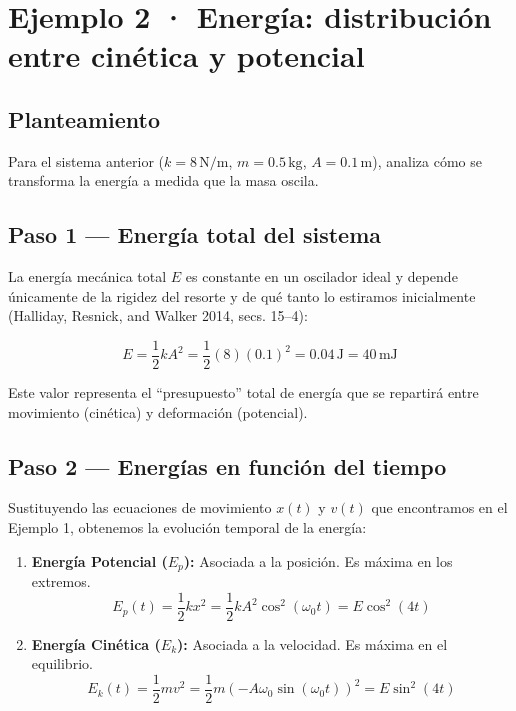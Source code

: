 \documentclass[
  letterpaper,
  DIV=11,
  numbers=noendperiod]{scrreprt}
\begin{document}
\section{Ejemplo 2 · Energía: distribución entre cinética y
potencial}\label{sec-osc-2}

\subsection{Planteamiento}\label{planteamiento-1}

Para el sistema anterior (\(k = 8\,\text{N/m}\), \(m = 0.5\,\text{kg}\),
\(A = 0.1\,\text{m}\)), analiza cómo se transforma la energía a medida
que la masa oscila.

\subsection{Paso 1 --- Energía total del
sistema}\label{paso-1-energuxeda-total-del-sistema}

La energía mecánica total \(E\) es constante en un oscilador ideal y
depende únicamente de la rigidez del resorte y de qué tanto lo estiramos
inicialmente (Halliday, Resnick, and Walker 2014, secs. 15--4):

\[
E = \frac{1}{2}kA^2 = \frac{1}{2}(8)(0.1)^2 = 0.04\,\text{J} = 40\,\text{mJ}
\]

Este valor representa el ``presupuesto'' total de energía que se
repartirá entre movimiento (cinética) y deformación (potencial).

\subsection{Paso 2 --- Energías en función del
tiempo}\label{paso-2-energuxedas-en-funciuxf3n-del-tiempo}

Sustituyendo las ecuaciones de movimiento \(x(t)\) y \(v(t)\) que
encontramos en el Ejemplo 1, obtenemos la evolución temporal de la
energía:

\begin{enumerate}
\def\labelenumi{\arabic{enumi}.}
\item
  \textbf{Energía Potencial (\(E_p\)):} Asociada a la posición. Es
  máxima en los extremos.
  \[E_p(t) = \frac{1}{2}kx^2 = \frac{1}{2}kA^2\cos^2(\omega_0 t) = E\cos^2(4t)\]
\item
  \textbf{Energía Cinética (\(E_k\)):} Asociada a la velocidad. Es
  máxima en el equilibrio.
  \[E_k(t) = \frac{1}{2}mv^2 = \frac{1}{2}m(-A\omega_0\sin(\omega_0 t))^2 = E\sin^2(4t)\]
\end{enumerate}
\end{document}
